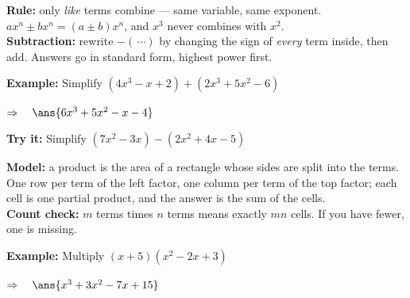 \documentclass[12pt]{article}
\begin{document}


\begin{formulabox}
\textbf{Rule:} only \textit{like} terms combine --- same variable, same
exponent. $ax^{n} \pm bx^{n} = (a \pm b)x^{n}$, and $x^{3}$ never combines with
$x^{2}$.\\[3pt]
\textbf{Subtraction:} rewrite $-(\,\cdots)$ by changing the sign of
\textit{every} term inside, then add. Answers go in standard form, highest power
first.
\end{formulabox}

\begin{examplebox}
\textbf{Example:} \quad Simplify $(4x^{3} - x + 2) + (2x^{3} + 5x^{2} - 6)$

$\Rightarrow\quad \ans{6x^3 + 5x^2 - x - 4}$
\end{examplebox}

\begin{tryitbox}
\textbf{Try it:} \quad Simplify $(7x^{2} - 3x) - (2x^{2} + 4x - 5)$\\[2pt]
\end{tryitbox}


\begin{formulabox}
\textbf{Model:} a product is the area of a rectangle whose sides are split into
the terms. One row per term of the left factor, one column per term of the top
factor; each cell is one partial product, and the answer is the sum of the
cells.\\[3pt]
\textbf{Count check:} $m$ terms times $n$ terms means exactly $mn$ cells. If you
have fewer, one is missing.
\end{formulabox}

\begin{examplebox}
\textbf{Example:} \quad Multiply $(x + 5)(x^{2} - 2x + 3)$

$\Rightarrow\quad \ans{x^3 + 3x^2 - 7x + 15}$
\end{examplebox}
\end{document}
